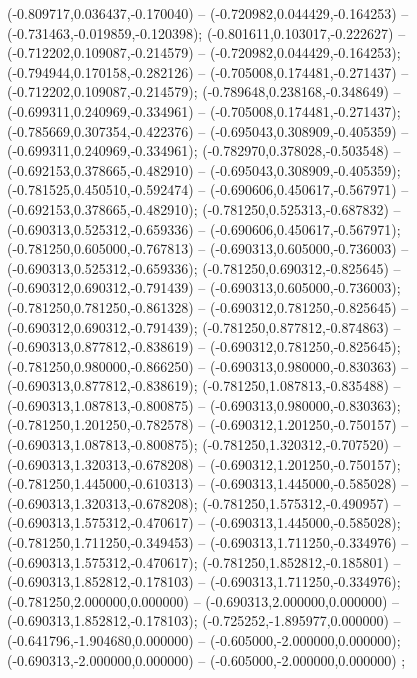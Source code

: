  (-0.809717,0.036437,-0.170040) -- (-0.720982,0.044429,-0.164253) -- (-0.731463,-0.019859,-0.120398);
 (-0.801611,0.103017,-0.222627) -- (-0.712202,0.109087,-0.214579) -- (-0.720982,0.044429,-0.164253);
 (-0.794944,0.170158,-0.282126) -- (-0.705008,0.174481,-0.271437) -- (-0.712202,0.109087,-0.214579);
 (-0.789648,0.238168,-0.348649) -- (-0.699311,0.240969,-0.334961) -- (-0.705008,0.174481,-0.271437);
 (-0.785669,0.307354,-0.422376) -- (-0.695043,0.308909,-0.405359) -- (-0.699311,0.240969,-0.334961);
 (-0.782970,0.378028,-0.503548) -- (-0.692153,0.378665,-0.482910) -- (-0.695043,0.308909,-0.405359);
 (-0.781525,0.450510,-0.592474) -- (-0.690606,0.450617,-0.567971) -- (-0.692153,0.378665,-0.482910);
 (-0.781250,0.525313,-0.687832) -- (-0.690313,0.525312,-0.659336) -- (-0.690606,0.450617,-0.567971);
 (-0.781250,0.605000,-0.767813) -- (-0.690313,0.605000,-0.736003) -- (-0.690313,0.525312,-0.659336);
 (-0.781250,0.690312,-0.825645) -- (-0.690312,0.690312,-0.791439) -- (-0.690313,0.605000,-0.736003);
 (-0.781250,0.781250,-0.861328) -- (-0.690312,0.781250,-0.825645) -- (-0.690312,0.690312,-0.791439);
 (-0.781250,0.877812,-0.874863) -- (-0.690313,0.877812,-0.838619) -- (-0.690312,0.781250,-0.825645);
 (-0.781250,0.980000,-0.866250) -- (-0.690313,0.980000,-0.830363) -- (-0.690313,0.877812,-0.838619);
 (-0.781250,1.087813,-0.835488) -- (-0.690313,1.087813,-0.800875) -- (-0.690313,0.980000,-0.830363);
 (-0.781250,1.201250,-0.782578) -- (-0.690312,1.201250,-0.750157) -- (-0.690313,1.087813,-0.800875);
 (-0.781250,1.320312,-0.707520) -- (-0.690313,1.320313,-0.678208) -- (-0.690312,1.201250,-0.750157);
 (-0.781250,1.445000,-0.610313) -- (-0.690313,1.445000,-0.585028) -- (-0.690313,1.320313,-0.678208);
 (-0.781250,1.575312,-0.490957) -- (-0.690313,1.575312,-0.470617) -- (-0.690313,1.445000,-0.585028);
 (-0.781250,1.711250,-0.349453) -- (-0.690313,1.711250,-0.334976) -- (-0.690313,1.575312,-0.470617);
 (-0.781250,1.852812,-0.185801) -- (-0.690313,1.852812,-0.178103) -- (-0.690313,1.711250,-0.334976);
 (-0.781250,2.000000,0.000000) -- (-0.690313,2.000000,0.000000) -- (-0.690313,1.852812,-0.178103);
 (-0.725252,-1.895977,0.000000) -- (-0.641796,-1.904680,0.000000) -- (-0.605000,-2.000000,0.000000);
 (-0.690313,-2.000000,0.000000) -- (-0.605000,-2.000000,0.000000) ;

